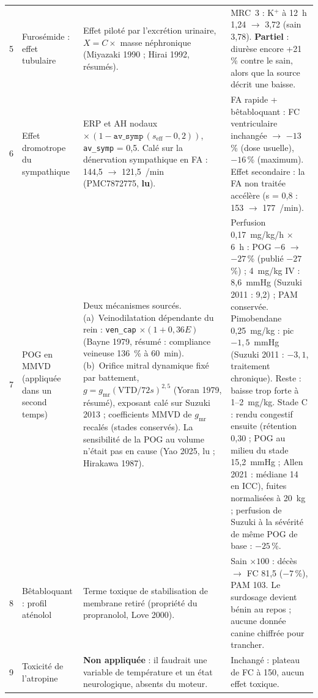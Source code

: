 \documentclass[10pt,a4paper]{article}
\newcommand{\cmd}[1]{\texttt{#1}}
\begin{document}
\begin{tabularx}{\linewidth}{@{}P{0.6cm}P{3.6cm}LP{3.6cm}@{}}
5 & Furosémide : effet tubulaire & Effet piloté par l'excrétion urinaire, $X = C \times$ masse néphronique (Miyazaki 1990 ; Hirai 1992, résumés). & MRC~3 : K$^+$ à 12~h 1,24 $\rightarrow$ 3,72 (sain 3,78). \textbf{Partiel} : diurèse encore +21\,\% contre le sain, alors que la source décrit une baisse.\\
6 & Effet dromotrope du sympathique & ERP et AH nodaux $\times\,(1 - \cmd{av\_symp}\,(s_\text{eff} - 0{,}2))$, \cmd{av\_symp} = 0,5. Calé sur la dénervation sympathique en FA : 144,5 $\rightarrow$ 121,5~/min (PMC7872775, \textbf{lu}). & FA rapide + bêtabloquant : FC ventriculaire inchangée $\rightarrow$ $-13$\,\% (dose usuelle), $-16$\,\% (maximum). Effet secondaire : la FA non traitée accélère (s = 0,8 : 153 $\rightarrow$ 177~/min).\\
7 & POG en MMVD (appliquée dans un second temps) & Deux mécanismes sourcés. (a)~Veinodilatation dépendante du rein : \cmd{ven\_cap} $\times(1 + 0{,}36E)$ (Bayne 1979, résumé : compliance veineuse 136~\% à 60~min). (b)~Orifice mitral dynamique fixé par battement, $g = g_\text{mr}(\text{VTD}/72s)^{2{,}5}$ (Yoran 1979, résumé), exposant calé sur Suzuki 2013 ; coefficients MMVD de $g_\text{mr}$ recalés (stades conservés). La sensibilité de la POG au volume n'était pas en cause (Yao 2025, lu ; Hirakawa 1987). & Perfusion 0,17~mg/kg/h $\times$ 6~h : POG $-6$ $\rightarrow$ $-27$\,\% (publié $-27$\,\%) ; 4~mg/kg IV : 8,6~mmHg (Suzuki 2011 : 9,2) ; PAM conservée. Pimobendane 0,25~mg/kg : pic $-1{,}5$~mmHg (Suzuki 2011 : $-3{,}1$, traitement chronique). Reste : baisse trop forte à 1--2~mg/kg. Stade C : rendu congestif ensuite (rétention 0,30 ; POG au milieu du stade 15,2~mmHg ; Allen 2021 : médiane 14 en ICC), fuites normalisées à 20~kg ; perfusion de Suzuki à la sévérité de même POG de base : $-25$\,\%.\\
8 & Bêtabloquant : profil aténolol & Terme toxique de stabilisation de membrane retiré (propriété du propranolol, Love 2000). & Sain $\times 100$ : décès $\rightarrow$ FC 81,5 ($-7$\,\%), PAM 103. Le surdosage devient bénin au repos ; aucune donnée canine chiffrée pour trancher.\\
9 & Toxicité de l'atropine & \textbf{Non appliquée} : il faudrait une variable de température et un état neurologique, absents du moteur. & Inchangé : plateau de FC à 150, aucun effet toxique.\\
\bottomrule
\end{tabularx}
\end{document}
